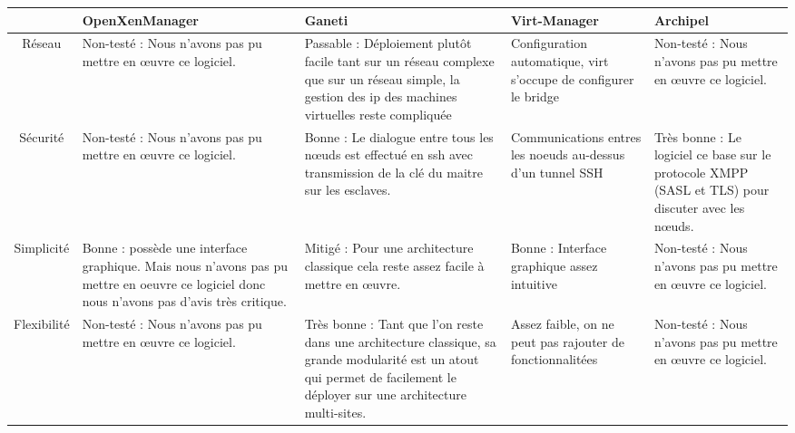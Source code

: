 \begin{center}
\begin{tabular}{|c|M{2.7cm}|M{2.7cm}|M{2.7cm}|M{2.7cm}|}
\hline
 & OpenXenManager & Ganeti & Virt-Manager & Archipel \tabularnewline
\hline
Réseau & Non-testé : Nous n’avons pas pu mettre en œuvre ce logiciel. & Passable : Déploiement plutôt facile tant sur un réseau complexe que sur un réseau simple, la gestion des ip des machines virtuelles reste compliquée & Configuration automatique, virt s'occupe de configurer le bridge & Non-testé : Nous n’avons pas pu mettre en œuvre ce logiciel.\tabularnewline
\hline
Sécurité & Non-testé : Nous n’avons pas pu mettre en œuvre ce logiciel. & Bonne : Le dialogue entre tous les nœuds est effectué en ssh avec transmission de la clé du maitre sur les esclaves. & Communications entres les noeuds au-dessus d'un tunnel SSH & Très bonne : Le logiciel ce base sur le protocole XMPP (SASL et TLS) pour discuter avec les nœuds.\tabularnewline
\hline
Simplicité & Bonne : possède une interface graphique. Mais nous n'avons pas pu mettre en oeuvre ce logiciel donc nous n'avons pas d'avis très critique. & Mitigé : Pour une architecture classique cela reste assez facile à mettre en œuvre. & Bonne : Interface graphique assez intuitive & Non-testé : Nous n’avons pas pu mettre en œuvre ce logiciel. \tabularnewline
\hline
Flexibilité & Non-testé : Nous n’avons pas pu mettre en œuvre ce logiciel. & Très bonne : Tant que l'on reste dans une architecture classique, sa grande modularité est un atout qui permet de facilement le déployer sur une architecture multi-sites. & Assez faible, on ne peut pas rajouter de fonctionnalitées& Non-testé : Nous n’avons pas pu mettre en œuvre ce logiciel. \tabularnewline
\hline
\end{tabular}
\end{center}
